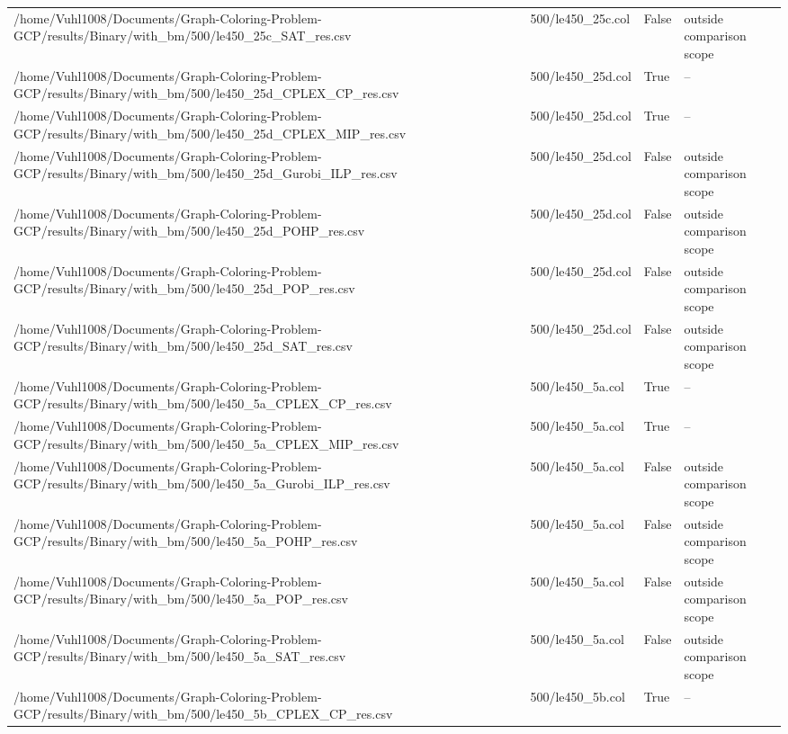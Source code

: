 \begin{table}[htbp]
\begin{tabular}{llll}
/home/Vuhl1008/Documents/Graph-Coloring-Problem-GCP/results/Binary/with\_bm/500/le450\_25c\_SAT\_res.csv & 500/le450\_25c.col & False & outside comparison scope \\
/home/Vuhl1008/Documents/Graph-Coloring-Problem-GCP/results/Binary/with\_bm/500/le450\_25d\_CPLEX\_CP\_res.csv & 500/le450\_25d.col & True & -- \\
/home/Vuhl1008/Documents/Graph-Coloring-Problem-GCP/results/Binary/with\_bm/500/le450\_25d\_CPLEX\_MIP\_res.csv & 500/le450\_25d.col & True & -- \\
/home/Vuhl1008/Documents/Graph-Coloring-Problem-GCP/results/Binary/with\_bm/500/le450\_25d\_Gurobi\_ILP\_res.csv & 500/le450\_25d.col & False & outside comparison scope \\
/home/Vuhl1008/Documents/Graph-Coloring-Problem-GCP/results/Binary/with\_bm/500/le450\_25d\_POHP\_res.csv & 500/le450\_25d.col & False & outside comparison scope \\
/home/Vuhl1008/Documents/Graph-Coloring-Problem-GCP/results/Binary/with\_bm/500/le450\_25d\_POP\_res.csv & 500/le450\_25d.col & False & outside comparison scope \\
/home/Vuhl1008/Documents/Graph-Coloring-Problem-GCP/results/Binary/with\_bm/500/le450\_25d\_SAT\_res.csv & 500/le450\_25d.col & False & outside comparison scope \\
/home/Vuhl1008/Documents/Graph-Coloring-Problem-GCP/results/Binary/with\_bm/500/le450\_5a\_CPLEX\_CP\_res.csv & 500/le450\_5a.col & True & -- \\
/home/Vuhl1008/Documents/Graph-Coloring-Problem-GCP/results/Binary/with\_bm/500/le450\_5a\_CPLEX\_MIP\_res.csv & 500/le450\_5a.col & True & -- \\
/home/Vuhl1008/Documents/Graph-Coloring-Problem-GCP/results/Binary/with\_bm/500/le450\_5a\_Gurobi\_ILP\_res.csv & 500/le450\_5a.col & False & outside comparison scope \\
/home/Vuhl1008/Documents/Graph-Coloring-Problem-GCP/results/Binary/with\_bm/500/le450\_5a\_POHP\_res.csv & 500/le450\_5a.col & False & outside comparison scope \\
/home/Vuhl1008/Documents/Graph-Coloring-Problem-GCP/results/Binary/with\_bm/500/le450\_5a\_POP\_res.csv & 500/le450\_5a.col & False & outside comparison scope \\
/home/Vuhl1008/Documents/Graph-Coloring-Problem-GCP/results/Binary/with\_bm/500/le450\_5a\_SAT\_res.csv & 500/le450\_5a.col & False & outside comparison scope \\
/home/Vuhl1008/Documents/Graph-Coloring-Problem-GCP/results/Binary/with\_bm/500/le450\_5b\_CPLEX\_CP\_res.csv & 500/le450\_5b.col & True & -- \\

\end{tabular}
\end{table}
